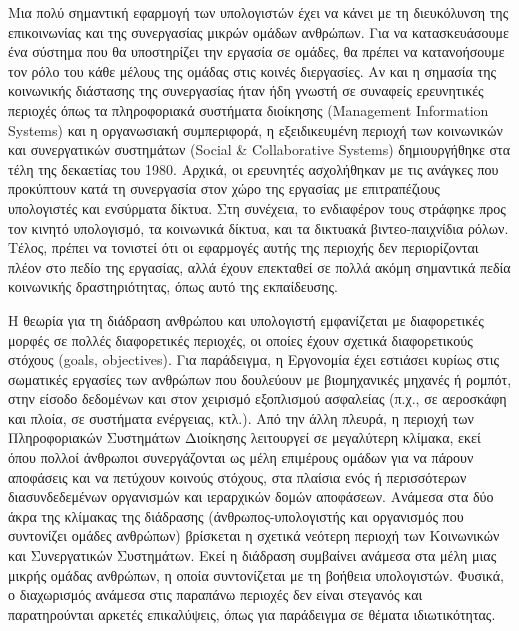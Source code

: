 \documentclass[
]{article}
\begin{document}
Μια πολύ σημαντική εφαρμογή των υπολογιστών έχει να κάνει με τη
διευκόλυνση της επικοινωνίας και της συνεργασίας μικρών ομάδων ανθρώπων.
Για να κατασκευάσουμε ένα σύστημα που θα υποστηρίζει την εργασία σε
ομάδες, θα πρέπει να κατανοήσουμε τον ρόλο του κάθε μέλους της ομάδας
στις κοινές διεργασίες. Αν και η σημασία της κοινωνικής διάστασης της
συνεργασίας ήταν ήδη γνωστή σε συναφείς ερευνητικές περιοχές όπως τα
πληροφοριακά συστήματα διοίκησης (Management Information Systems) και η
οργανωσιακή συμπεριφορά, η εξειδικευμένη περιοχή των κοινωνικών και
συνεργατικών συστημάτων (Social \& Collaborative Systems) δημιουργήθηκε
στα τέλη της δεκαετίας του 1980. Αρχικά, οι ερευνητές ασχολήθηκαν με τις
ανάγκες που προκύπτουν κατά τη συνεργασία στον χώρο της εργασίας με
επιτραπέζιους υπολογιστές και ενσύρματα δίκτυα. Στη συνέχεια, το
ενδιαφέρον τους στράφηκε προς τον κινητό υπολογισμό, τα κοινωνικά
δίκτυα, και τα δικτυακά βιντεο-παιχνίδια ρόλων. Τέλος, πρέπει να
τονιστεί ότι οι εφαρμογές αυτής της περιοχής δεν περιορίζονται πλέον στο
πεδίο της εργασίας, αλλά έχουν επεκταθεί σε πολλά ακόμη σημαντικά πεδία
κοινωνικής δραστηριότητας, όπως αυτό της εκπαίδευσης.

Η θεωρία για τη διάδραση ανθρώπου και υπολογιστή εμφανίζεται με
διαφορετικές μορφές σε πολλές διαφορετικές περιοχές, οι οποίες έχουν
σχετικά διαφορετικούς στόχους (goals, objectives). Για παράδειγμα, η
Εργονομία έχει εστιάσει κυρίως στις σωματικές εργασίες των ανθρώπων που
δουλεύουν με βιομηχανικές μηχανές ή ρομπότ, στην είσοδο δεδομένων και
στον χειρισμό εξοπλισμού ασφαλείας (π.χ., σε αεροσκάφη και πλοία, σε
συστήματα ενέργειας, κτλ.). Από την άλλη πλευρά, η περιοχή των
Πληροφοριακών Συστημάτων Διοίκησης λειτουργεί σε μεγαλύτερη κλίμακα,
εκεί όπου πολλοί άνθρωποι συνεργάζονται ως μέλη επιμέρους ομάδων για να
πάρουν αποφάσεις και να πετύχουν κοινούς στόχους, στα πλαίσια ενός ή
περισσότερων διασυνδεδεμένων οργανισμών και ιεραρχικών δομών αποφάσεων.
Ανάμεσα στα δύο άκρα της κλίμακας της διάδρασης (άνθρωπος-υπολογιστής
και οργανισμός που συντονίζει ομάδες ανθρώπων) βρίσκεται η σχετικά
νεότερη περιοχή των Κοινωνικών και Συνεργατικών Συστημάτων. Εκεί η
διάδραση συμβαίνει ανάμεσα στα μέλη μιας μικρής ομάδας ανθρώπων, η οποία
συντονίζεται με τη βοήθεια υπολογιστών. Φυσικά, ο διαχωρισμός ανάμεσα
στις παραπάνω περιοχές δεν είναι στεγανός και παρατηρούνται αρκετές
επικαλύψεις, όπως για παράδειγμα σε θέματα ιδιωτικότητας.
\end{document}
